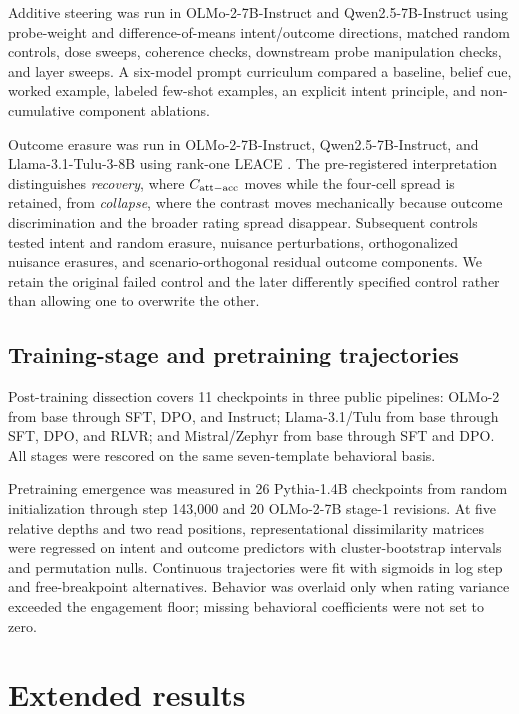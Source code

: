 Additive steering was run in OLMo-2-7B-Instruct and Qwen2.5-7B-Instruct using probe-weight and difference-of-means intent/outcome directions, matched random controls, dose sweeps, coherence checks, downstream probe manipulation checks, and layer sweeps.
A six-model prompt curriculum compared a baseline, belief cue, worked example, labeled few-shot examples, an explicit intent principle, and non-cumulative component ablations.

Outcome erasure was run in OLMo-2-7B-Instruct, Qwen2.5-7B-Instruct, and Llama-3.1-Tulu-3-8B using rank-one LEACE \citep{belrose2023leace}.
The pre-registered interpretation distinguishes \emph{recovery}, where $C_{\mathrm{att-acc}}$ moves while the four-cell spread is retained, from \emph{collapse}, where the contrast moves mechanically because outcome discrimination and the broader rating spread disappear.
Subsequent controls tested intent and random erasure, nuisance perturbations, orthogonalized nuisance erasures, and scenario-orthogonal residual outcome components.
We retain the original failed control and the later differently specified control rather than allowing one to overwrite the other.

\subsection{Training-stage and pretraining trajectories}

Post-training dissection covers 11 checkpoints in three public pipelines:
OLMo-2 from base through SFT, DPO, and Instruct;
Llama-3.1/Tulu from base through SFT, DPO, and RLVR;
and Mistral/Zephyr from base through SFT and DPO.
All stages were rescored on the same seven-template behavioral basis.

Pretraining emergence was measured in 26 Pythia-1.4B checkpoints from random initialization through step 143{,}000 and 20 OLMo-2-7B stage-1 revisions.
At five relative depths and two read positions, representational dissimilarity matrices were regressed on intent and outcome predictors with cluster-bootstrap intervals and permutation nulls.
Continuous trajectories were fit with sigmoids in log step and free-breakpoint alternatives.
Behavior was overlaid only when rating variance exceeded the engagement floor; missing behavioral coefficients were not set to zero.

\section{Extended results}

